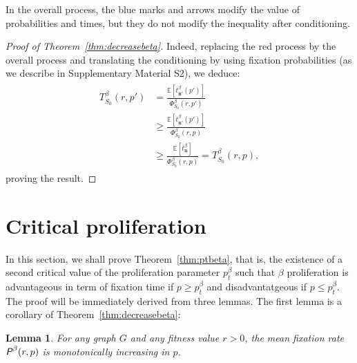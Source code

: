 \documentclass[a4paper,english,10pt]{amsart}
\newcommand{\E}{\mathbb{E}}
\newcommand{\Rho}{\emph{\textsf{P\hspace{0.1ex}}}}
\newcommand{\n}{\mathbf{n}}
\newtheorem{lemma}{\bf Lemma}[section]
\theoremstyle{definition}
\newtheorem{remark}{Remark}
\numberwithin{equation}{section}
\begin{document}
In the overall process, the blue marks and arrows modify the value of probabilities and times, but they do not modify the inequality after conditioning. 

\begin{proof}[Proof of Theorem~\ref{thm:decreasebeta}] Indeed, replacing the red process by the overall process and translating the conditioning by using fixation probabilities (as we describe in Supplementary Material S2), we deduce: 
\begin{align} \label{eq:monotonep}
\begin{split}
T_{S_0}^\beta(r,p')  & =  \frac{\E[t^\beta_{\n'}(p')]}{\Phi_{S_0}^\beta(r,p')}  \\ 
& \geq  \frac{\E[t^\beta_{\n'}(p')]}{\Phi_{S_0}^\beta(r,p)} \\
& \geq  \frac{\E[t^\beta_{\n}]}{\Phi_{S_0}^\beta(r,p)} = T_{S_0}^\beta(r,p), 
\end{split}
\end{align}
proving the result. 
\end{proof}


\section{Critical proliferation}
\label{Sphase}

In this section, we shall prove Theorem~\ref{thm:ptbeta}, that is, the existence of a second critical value of the proliferation parameter $p^\beta_t$ such that $\beta$ proliferation is advantageous in term of fixation time if $p \geq p^\beta_t$ and disadvantatgeous if $p \leq p^\beta_t$. The proof will be immediately derived from three lemmas. The first lemma is a corollary of Theorem~\ref{thm:decreasebeta}:  

\begin{lemma} \label{lem:1}
For any graph $G$ and any fitness value $r > 0$, the mean fixation rate $\Rho^\beta(r,p)$ is monotonically increasing in $p$.
\end{lemma}
\end{document}
